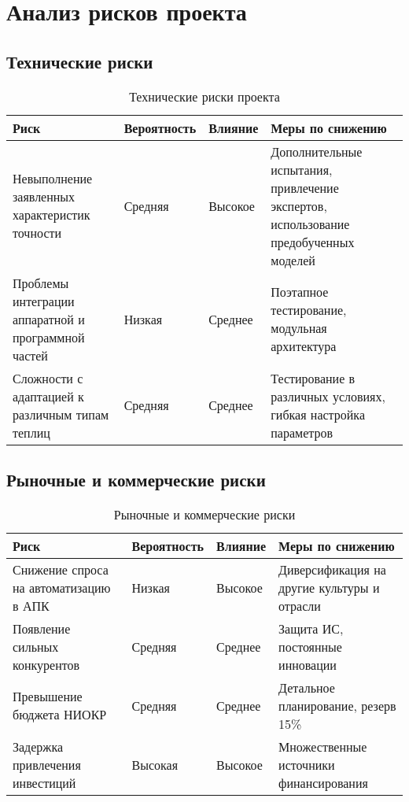 \documentclass[12pt,a4paper]{article}
\begin{document}
\section{Анализ рисков проекта}

\subsection{Технические риски}

\begin{table}[h]
\centering
\begin{tabular}{|p{4cm}|p{2cm}|p{2cm}|p{6cm}|}
\hline
\textbf{Риск} & \textbf{Вероятность} & \textbf{Влияние} & \textbf{Меры по снижению} \\
\hline
Невыполнение заявленных характеристик точности & Средняя & Высокое & Дополнительные испытания, привлечение экспертов, использование предобученных моделей \\
\hline
Проблемы интеграции аппаратной и программной частей & Низкая & Среднее & Поэтапное тестирование, модульная архитектура \\
\hline
Сложности с адаптацией к различным типам теплиц & Средняя & Среднее & Тестирование в различных условиях, гибкая настройка параметров \\
\hline
\end{tabular}
\caption{Технические риски проекта}
\end{table}

\subsection{Рыночные и коммерческие риски}

\begin{table}[h]
\centering
\begin{tabular}{|p{4cm}|p{2cm}|p{2cm}|p{6cm}|}
\hline
\textbf{Риск} & \textbf{Вероятность} & \textbf{Влияние} & \textbf{Меры по снижению} \\
\hline
Снижение спроса на автоматизацию в АПК & Низкая & Высокое & Диверсификация на другие культуры и отрасли \\
\hline
Появление сильных конкурентов & Средняя & Среднее & Защита ИС, постоянные инновации \\
\hline
Превышение бюджета НИОКР & Средняя & Среднее & Детальное планирование, резерв 15\% \\
\hline
Задержка привлечения инвестиций & Высокая & Высокое & Множественные источники финансирования \\
\hline
\end{tabular}
\caption{Рыночные и коммерческие риски}
\end{table}
\end{document}

